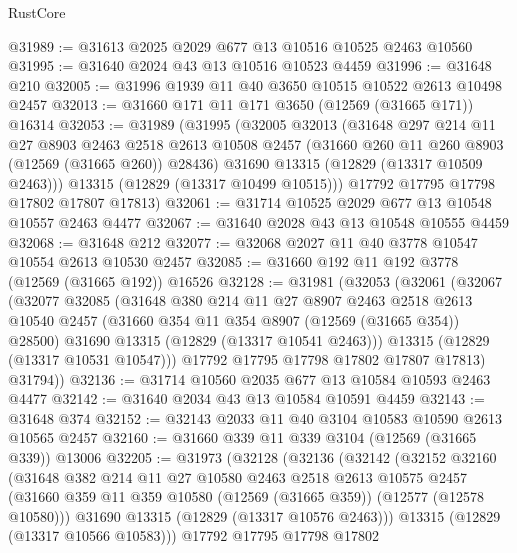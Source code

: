 \begin{lexlean}{RustCore}
\begin{coremodule}
@31989 := @31613 @2025 @2029 @677 @13 @10516 @10525 @2463 @10560
@31995 := @31640 @2024 @43 @13 @10516 @10523 @4459
@31996 := @31648 @210
@32005 := @31996 @1939 @11 @40 @3650 @10515 @10522 @2613 @10498 @2457
@32013 := @31660 @171 @11 @171 @3650 (@12569 (@31665 @171)) @16314
@32053 := @31989
    (@31995
      (@32005
        @32013
        (@31648
          @297
          @214
          @11
          @27
          @8903
          @2463
          @2518
          @2613
          @10508
          @2457
          (@31660 @260 @11 @260 @8903 (@12569 (@31665 @260)) @28436)
          @31690
          @13315
          (@12829 (@13317 @10509 @2463)))
        @13315
        (@12829 (@13317 @10499 @10515)))
      @17792
      @17795
      @17798
      @17802
      @17807
      @17813)
@32061 := @31714 @10525 @2029 @677 @13 @10548 @10557 @2463 @4477
@32067 := @31640 @2028 @43 @13 @10548 @10555 @4459
@32068 := @31648 @212
@32077 := @32068 @2027 @11 @40 @3778 @10547 @10554 @2613 @10530 @2457
@32085 := @31660 @192 @11 @192 @3778 (@12569 (@31665 @192)) @16526
@32128 := @31981
    (@32053
      (@32061
        (@32067
          (@32077
            @32085
            (@31648
              @380
              @214
              @11
              @27
              @8907
              @2463
              @2518
              @2613
              @10540
              @2457
              (@31660 @354 @11 @354 @8907 (@12569 (@31665 @354)) @28500)
              @31690
              @13315
              (@12829 (@13317 @10541 @2463)))
            @13315
            (@12829 (@13317 @10531 @10547)))
          @17792
          @17795
          @17798
          @17802
          @17807
          @17813)
        @31794))
@32136 := @31714 @10560 @2035 @677 @13 @10584 @10593 @2463 @4477
@32142 := @31640 @2034 @43 @13 @10584 @10591 @4459
@32143 := @31648 @374
@32152 := @32143 @2033 @11 @40 @3104 @10583 @10590 @2613 @10565 @2457
@32160 := @31660 @339 @11 @339 @3104 (@12569 (@31665 @339)) @13006
@32205 := @31973
    (@32128
      (@32136
        (@32142
          (@32152
            @32160
            (@31648
              @382
              @214
              @11
              @27
              @10580
              @2463
              @2518
              @2613
              @10575
              @2457
              (@31660 @359 @11 @359 @10580 (@12569 (@31665 @359)) (@12577 (@12578 @10580)))
              @31690
              @13315
              (@12829 (@13317 @10576 @2463)))
            @13315
            (@12829 (@13317 @10566 @10583)))
          @17792
          @17795
          @17798
          @17802

\end{coremodule}
\end{lexlean}

